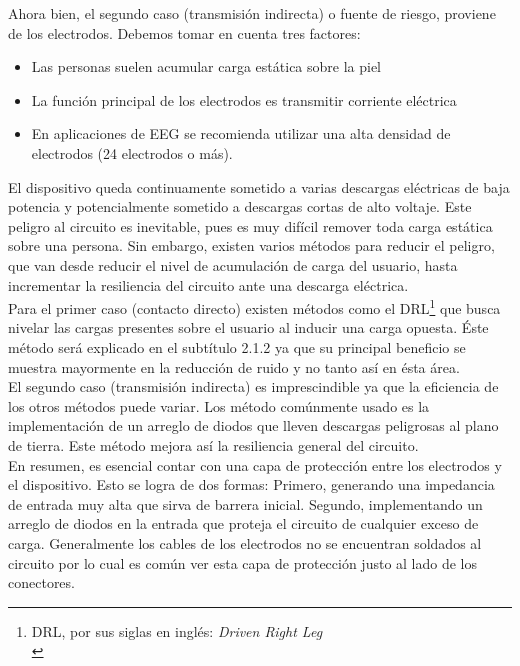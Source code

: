 Ahora bien, el segundo caso (transmisión indirecta) o fuente de riesgo, proviene de los electrodos. Debemos tomar en cuenta tres factores:\\
\begin{itemize}
\item Las personas suelen acumular carga estática sobre la piel\\
\item La función principal de los electrodos es transmitir corriente eléctrica\\
\item En aplicaciones de EEG se recomienda utilizar una alta densidad de electrodos (24 electrodos o más).\\
\end{itemize}

El dispositivo queda continuamente sometido a varias descargas eléctricas de baja potencia y potencialmente sometido a descargas cortas de alto voltaje. Este peligro al circuito es inevitable, pues es muy difícil remover toda carga estática sobre una persona. Sin embargo, existen varios métodos para reducir el peligro, que van desde reducir el nivel de acumulación de carga del usuario, hasta incrementar la resiliencia del circuito ante una descarga eléctrica.\\

Para el primer caso (contacto directo) existen métodos como el DRL\footnote{DRL, por sus siglas en inglés: \emph{Driven Right Leg}\\} \cite{Winter1983} que busca nivelar las cargas presentes sobre el usuario al inducir una carga opuesta. Éste método será explicado en el subtítulo 2.1.2 ya que su principal beneficio se muestra mayormente en la reducción de ruido y no tanto así en ésta área.\\

El segundo caso (transmisión indirecta) es imprescindible ya que la eficiencia de los otros métodos puede variar. Los método comúnmente usado es la implementación de un arreglo de diodos que lleven descargas peligrosas al plano de tierra. Este método mejora así la resiliencia general del circuito.\\

En resumen, es esencial contar con una capa de protección entre los electrodos y el dispositivo. Esto se logra de dos formas: Primero, generando una impedancia de entrada muy alta que sirva de barrera inicial. Segundo, implementando un arreglo de diodos en la entrada que proteja el circuito de cualquier exceso de carga. Generalmente los cables de los electrodos no se encuentran soldados al circuito por lo cual es común ver esta capa de protección justo al lado de los conectores.\\

